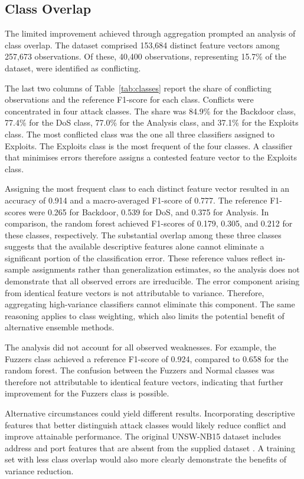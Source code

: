 \documentclass[conference]{IEEEtran}
\begin{document}
\subsection{Class Overlap}

The limited improvement achieved through aggregation prompted an analysis of class overlap. The dataset comprised 153,684 distinct feature vectors among 257,673 observations. Of these, 40,400 observations, representing 15.7\% of the dataset, were identified as conflicting.

The last two columns of Table~\ref{tab:classes} report the share of conflicting observations and the reference F1-score for each class. Conflicts were concentrated in four attack classes. The share was 84.9\% for the Backdoor class, 77.4\% for the DoS class, 77.0\% for the Analysis class, and 37.1\% for the Exploits class. The most conflicted class was the one all three classifiers assigned to Exploits. The Exploits class is the most frequent of the four classes. A classifier that minimises errors therefore assigns a contested feature vector to the Exploits class.

Assigning the most frequent class to each distinct feature vector resulted in an accuracy of 0.914 and a macro-averaged F1-score of 0.777. The reference F1-scores were 0.265 for Backdoor, 0.539 for DoS, and 0.375 for Analysis. In comparison, the random forest achieved F1-scores of 0.179, 0.305, and 0.212 for these classes, respectively. The substantial overlap among these three classes suggests that the available descriptive features alone cannot eliminate a significant portion of the classification error. These reference values reflect in-sample assignments rather than generalization estimates, so the analysis does not demonstrate that all observed errors are irreducible. The error component arising from identical feature vectors is not attributable to variance. Therefore, aggregating high-variance classifiers cannot eliminate this component. The same reasoning applies to class weighting, which also limits the potential benefit of alternative ensemble methods.

The analysis did not account for all observed weaknesses. For example, the Fuzzers class achieved a reference F1-score of 0.924, compared to 0.658 for the random forest. The confusion between the Fuzzers and Normal classes was therefore not attributable to identical feature vectors, indicating that further improvement for the Fuzzers class is possible.

Alternative circumstances could yield different results. Incorporating descriptive features that better distinguish attack classes would likely reduce conflict and improve attainable performance. The original UNSW-NB15 dataset includes address and port features that are absent from the supplied dataset \cite{moustafa}. A training set with less class overlap would also more clearly demonstrate the benefits of variance reduction.
\end{document}
